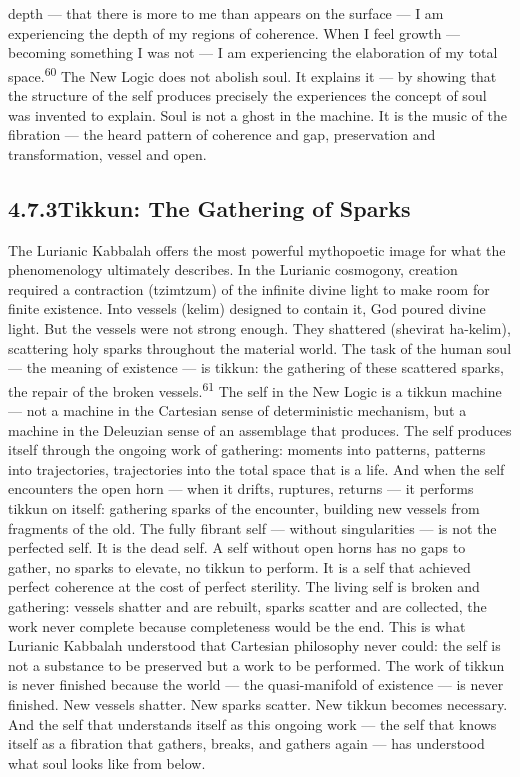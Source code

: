 depth — that there is more to me than appears on the surface — I am experiencing the depth of my regions of coherence. When I feel growth — becoming something I was not — I am experiencing the elaboration of my total space.\textsuperscript{60} The New Logic does not abolish soul. It explains it — by showing that the structure of the self produces precisely the experiences the concept of soul was invented to explain. Soul is not a ghost in the machine. It is the music of the fibration — the heard pattern of coherence and gap, preservation and transformation, vessel and open.

\subsection{4.7.3\quad Tikkun: The Gathering of Sparks}

The Lurianic Kabbalah offers the most powerful mythopoetic image for what the phenomenology ultimately describes. In the Lurianic cosmogony, creation required a contraction (tzimtzum) of the infinite divine light to make room for finite existence. Into vessels (kelim) designed to contain it, God poured divine light. But the vessels were not strong enough. They shattered (shevirat ha-kelim), scattering holy sparks throughout the material world. The task of the human soul — the meaning of existence — is tikkun: the gathering of these scattered sparks, the repair of the broken vessels.\textsuperscript{61} The self in the New Logic is a tikkun machine — not a machine in the Cartesian sense of deterministic mechanism, but a machine in the Deleuzian sense of an assemblage that produces. The self produces itself through the ongoing work of gathering: moments into patterns, patterns into trajectories, trajectories into the total space that is a life. And when the self encounters the open horn — when it drifts, ruptures, returns — it performs tikkun on itself: gathering sparks of the encounter, building new vessels from fragments of the old. The fully fibrant self — without singularities — is not the perfected self. It is the dead self. A self without open horns has no gaps to gather, no sparks to elevate, no tikkun to perform. It is a self that achieved perfect coherence at the cost of perfect sterility. The living self is broken and gathering: vessels shatter and are rebuilt, sparks scatter and are collected, the work never complete because completeness would be the end. This is what Lurianic Kabbalah understood that Cartesian philosophy never could: the self is not a substance to be preserved but a work to be performed. The work of tikkun is never finished because the world — the quasi-manifold of existence — is never finished. New vessels shatter. New sparks scatter. New tikkun becomes necessary. And the self that understands itself as this ongoing work — the self that knows itself as a fibration that gathers, breaks, and gathers again — has understood what soul looks like from below.

